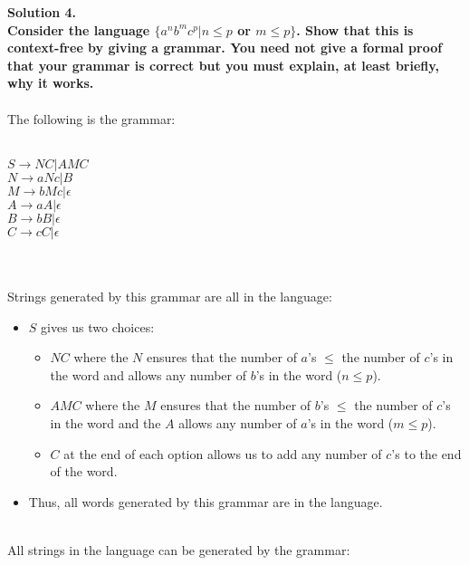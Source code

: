 \documentclass{article}
\begin{document}
\noindent \textbf{Solution 4. 
\\Consider the language \(\{a^n b^m c^p | n\leq p \) or \(m \leq p\}\). Show that this is context-free by giving a grammar. You need not give a formal proof that your grammar is correct but you must explain, at least briefly, why it works.
}
\\
\\
\noindent The following is the grammar:

\begin{addmargin}[5em]{2em}%
\\ \(S\to NC | AMC\)
\\ \(N\to aNc|B\)
\\ \(M \to bMc | \epsilon\)
\\ \(A \to aA | \epsilon\)
\\ \(B \to bB | \epsilon\)
\\ \(C \to cC| \epsilon\)
\end{addmargin}
\\
\\
Strings generated by this grammar are all in the language:
\begin{itemize}
    \item \(S\) gives us two choices: 
    \begin{itemize}
        \item \(NC\) where the \(N\) ensures that the number of \(a\)'s \(\leq\) the number of \(c\)'s in the word and allows any number of \(b\)'s in the word (\(n\leq p\)).
        \item \(AMC\) where the \(M\) ensures that the number of \(b\)'s \(\leq\) the number of \(c\)'s in the word and the \(A\) allows any number of \(a\)'s in the word (\(m \leq p\)).
        \item \(C\) at the end of each option allows us to add any number of \(c\)'s to the end of the word.
    \end{itemize}
    \item Thus, all words generated by this grammar are in the language.
\end{itemize}
\\All strings in the language can be generated by the grammar:
\end{document}
